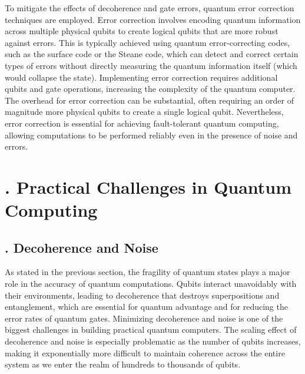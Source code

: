 \documentclass{elbioimp2}
\begin{document}
To mitigate the effects of decoherence and gate errors, quantum error correction techniques are employed. Error correction involves encoding quantum information across multiple physical qubits to create logical qubits that are more robust against errors. This is typically achieved using quantum error-correcting codes, such as the surface code or the Steane code, which can detect and correct certain types of errors without directly measuring the quantum information itself (which would collapse the state). Implementing error correction requires additional qubits and gate operations, increasing the complexity of the quantum computer. The overhead for error correction can be substantial, often requiring an order of magnitude more physical qubits to create a single logical qubit. Nevertheless, error correction is essential for achieving fault-tolerant quantum computing, allowing computations to be performed reliably even in the presence of noise and errors.


\section{. Practical Challenges in Quantum Computing}
\subsection{. Decoherence and Noise}
As stated in the previous section, the fragility of quantum states plays a major role in the accuracy of quantum computations. Qubits interact unavoidably with their environments, leading to decoherence that destroys superpositions and entanglement, which are essential for quantum advantage and for reducing the error rates of quantum gates. Minimizing decoherence and noise is one of the biggest challenges in building practical quantum computers. The scaling effect of decoherence and noise is especially problematic as the number of qubits increases, making it exponentially more difficult to maintain coherence across the entire system as we enter the realm of hundreds to thousands of qubits.
\end{document}
